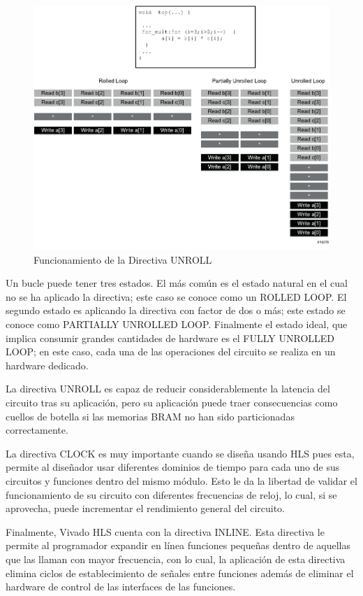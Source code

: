 \begin{figure}[H]
	\centering
		\includegraphics[scale=0.8]{./Figures/HLS4.pdf}
	\caption{Funcionamiento de la Directiva UNROLL \citep{HLS2015}}
	\label{fig:HLS4}
\end{figure}

Un bucle puede tener tres estados. El más común es el estado natural en el cual no se ha aplicado la directiva; este caso se conoce como un ROLLED LOOP. El segundo estado es aplicando la directiva con factor de dos o más; este estado se conoce como PARTIALLY UNROLLED LOOP. Finalmente el estado ideal, que implica consumir grandes cantidades de hardware es el FULLY UNROLLED LOOP; en este caso, cada una de las operaciones del circuito se realiza en un hardware dedicado.

La directiva UNROLL es capaz de reducir considerablemente la latencia del circuito tras su aplicación, pero su aplicación puede traer consecuencias como cuellos de botella si las memorias BRAM no han sido particionadas correctamente.

La directiva CLOCK es muy importante cuando se diseña usando HLS pues esta, permite al diseñador usar diferentes dominios de tiempo para cada uno de sus circuitos y funciones dentro del mismo módulo. Esto le da la libertad de validar el funcionamiento de su circuito con diferentes frecuencias de reloj, lo cual, si se aprovecha, puede incrementar el rendimiento general del circuito.

Finalmente, Vivado HLS cuenta con la directiva INLINE. Esta directiva le permite al programador expandir en línea funciones pequeñas dentro de aquellas que las llaman con mayor frecuencia, con lo cual, la aplicación de esta directiva elimina ciclos de establecimiento de señales entre funciones además de eliminar el hardware de control de las interfaces de las funciones.

